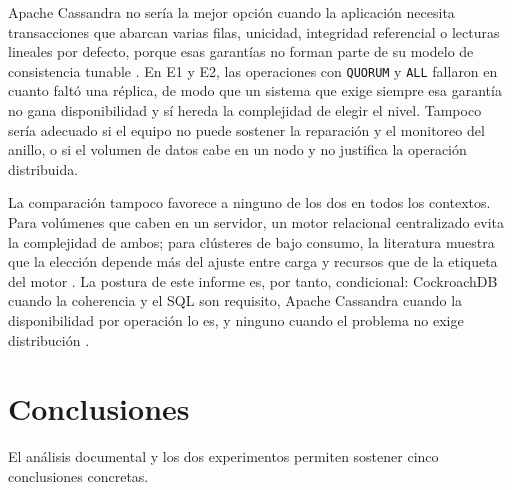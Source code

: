 \documentclass[11pt,a4paper]{article}
\newcommand{\sistemaA}{CockroachDB}      %
\newcommand{\sistemaB}{Apache Cassandra} %
\begin{document}
\sistemaB{} no sería la mejor opción cuando la aplicación necesita transacciones que
abarcan varias filas, unicidad, integridad referencial o lecturas lineales por
defecto, porque esas garantías no forman parte de su modelo de consistencia
tunable \cite{apacheCassandraGuarantees}. En E1 y E2, las operaciones con
\texttt{QUORUM} y \texttt{ALL} fallaron en cuanto faltó una réplica, de modo que un
sistema que exige siempre esa garantía no gana disponibilidad y sí hereda la
complejidad de elegir el nivel. Tampoco sería adecuado si el equipo no puede sostener
la reparación y el monitoreo del anillo, o si el volumen de datos cabe en un nodo y
no justifica la operación distribuida.

La comparación tampoco favorece a ninguno de los dos en todos los contextos. Para
volúmenes que caben en un servidor, un motor relacional centralizado evita la
complejidad de ambos; para clústeres de bajo consumo, la literatura muestra que la
elección depende más del ajuste entre carga y recursos que de la etiqueta del
motor \cite{silva2023lowpower}. La postura de este informe es, por tanto,
condicional: \sistemaA{} cuando la coherencia y el SQL son requisito, \sistemaB{}
cuando la disponibilidad por operación lo es, y ninguno cuando el problema no exige
distribución \cite{cockroachlabsReplication,apacheCassandraDynamo}.

\section{Conclusiones}
El análisis documental y los dos experimentos permiten sostener cinco conclusiones
concretas.
\end{document}
